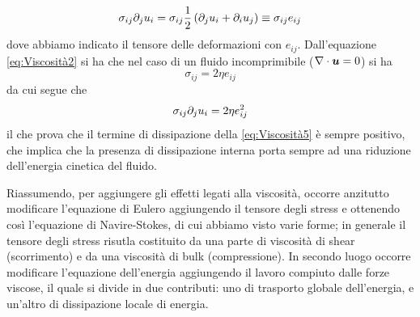 \begin{equation}
\sigma_{ij}\partial_j u_i = \sigma_{ij} \dfrac{1}{2}\left( \partial_j u_i + \partial_i u_j \right) \equiv \sigma_{ij} e_{ij}
\end{equation}
dove abbiamo indicato il tensore delle deformazioni con $e_{ij}$. Dall'equazione \ref{eq:Viscosità2} si ha che nel caso di un fluido incomprimibile ($\Div{u}=0$) si ha
\begin{equation}
\sigma_{ij} = 2 \eta e_{ij}
\end{equation}
da cui segue che
\begin{equation}
\sigma_{ij} \partial_j u_i = 2 \eta e_{ij}^2 \label{eq:Viscosità15}
\end{equation}
il che prova che il termine di dissipazione della \ref{eq:Viscosità5} è sempre positivo, che implica che la presenza di dissipazione interna porta sempre ad una riduzione dell'energia cinetica del fluido.

Riassumendo, per aggiungere gli effetti legati alla viscosità, occorre anzitutto modificare l'equazione di Eulero aggiungendo il tensore degli stress e ottenendo così l'equazione di Navire-Stokes, di cui abbiamo visto varie forme; in generale il tensore degli stress risutla costituito da una parte di viscosità di shear (scorrimento) e da una viscosità di bulk (compressione). In secondo luogo occorre modificare l'equazione dell'energia aggiungendo il lavoro compiuto dalle forze viscose, il quale si divide in due contributi: uno di trasporto globale dell'energia, e un'altro di dissipazione locale di energia.

